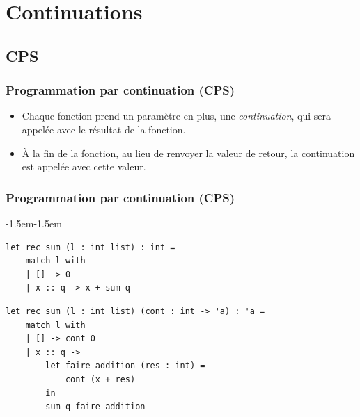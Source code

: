 \section{Continuations}

\subsection{CPS}
\begin{frame}[fragile,t]
    \frametitle{Programmation par continuation (CPS)}

    \begin{itemize}
        \item Chaque fonction prend un paramètre en plus, une \textit{continuation},
              qui sera appelée avec le résultat de la fonction.
        \item À la fin de la fonction, au lieu de renvoyer la valeur de retour,
              la continuation est appelée avec cette valeur.
    \end{itemize}
\end{frame}

\begin{frame}[fragile,t]
    \frametitle{Programmation par continuation (CPS)}

    \begin{adjustwidth}{-1.5em}{-1.5em}
        \begin{verbatim}
let rec sum (l : int list) : int =
    match l with
    | [] -> 0
    | x :: q -> x + sum q
        \end{verbatim}

        \vspace{0.5cm}

        \begin{verbatim}
let rec sum (l : int list) (cont : int -> 'a) : 'a =
    match l with
    | [] -> cont 0
    | x :: q ->
        let faire_addition (res : int) =
            cont (x + res)
        in
        sum q faire_addition
        \end{verbatim}
    \end{adjustwidth}

\end{frame}

